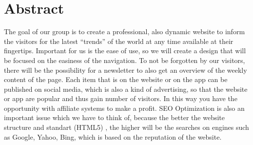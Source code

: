 %
%
\newpage

%
%
\section*{Abstract}
The goal of our group is to create a professional, also dynamic website to inform the visitors
for the latest “trends” of the world at any time available at their fingertips. Important for us is
the ease of use, so we will create a design that will be focused on the easiness of the
navigation. To not be forgotten by our visitors, there will be the possibility for a newsletter to
also get an overview of the weekly content of the page. Each item that is on the website or
on the app can be published on social media, which is also a kind of advertising, so that the
website or app are popular and thus gain number of visitors. In this way you have the
opportunity with affiliate systems to make a profit. SEO Optimization is also an important
issue which we have to think of, because the better the website structure and standart
(HTML5) , the higher will be the searches on engines such as Google, Yahoo, Bing, which is
based on the reputation of the website.


\color{black} 
